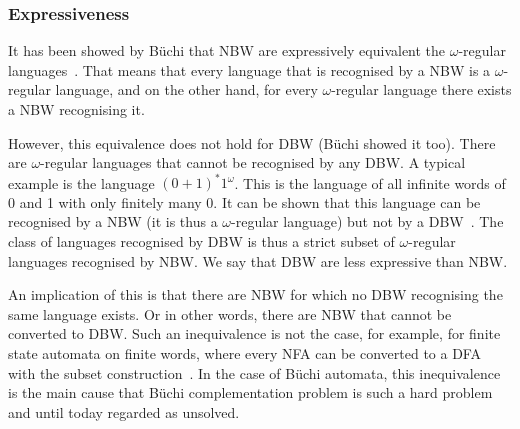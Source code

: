 \documentclass[a4paper]{report}
\newcommand{\om}{{$\omega$}}
\begin{document}
\subsubsection{Expressiveness}
It has been showed by Büchi that NBW are expressively equivalent the \om-regular languages~\cite{buchi1960decision}. That means that every language that is recognised by a NBW is a \om-regular language, and on the other hand, for every \om-regular language there exists a NBW recognising it.

However, this equivalence does not hold for DBW (Büchi showed it too). There are \om-regular languages that cannot be recognised by any DBW. A typical example is the language $(0+1)^*1^\omega$. This is the language of all infinite words of 0 and 1 with only finitely many 0. It can be shown that this language can be recognised by a NBW (it is thus a \om-regular language) but not by a DBW~\cite{1996_vardi}\cite{2002_roggenbach}. The class of languages recognised by DBW is thus a strict subset of \om-regular languages recognised by NBW. We say that DBW are less expressive than NBW.

An implication of this is that there are NBW for which no DBW recognising the same language exists. Or in other words, there are NBW that cannot be converted to DBW. Such an inequivalence is not the case, for example, for finite state automata on finite words, where every NFA can be converted to a DFA with the subset construction~\cite{hopcroft2006automata}\cite{1959_rabin}. In the case of Büchi automata, this inequivalence is the main cause that Büchi complementation problem is such a hard problem~\cite{niessner1997deterministic} and until today regarded as unsolved. 



\end{document}
